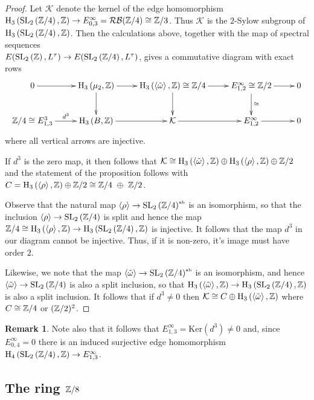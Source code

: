 \documentclass[12pt]{amsart}
\theoremstyle{definition}
\newtheorem{rem}[lem]{Remark}
\newcommand{\Z}{\Bbb{Z}}
\newcommand{\LL}{L^{\tau}}
\newcommand{\spl}[2]{\operatorname{SL}_{#1}\left(#2\right)}
\newcommand{\rbl}[1]{{\mathcal{RB}}(#1)}%
\newcommand{\<}{\langle}
\renewcommand{\>}{\rangle}
\renewcommand{\ker}[1]{\mathrm{Ker}(#1)}
\newcommand{\an}[1]{\left\langle{#1}\right\rangle}
\newcommand{\gab}[1]{{#1}^{\mbox{\tiny{ab}}}}%
\newcommand{\ho}[3]{\mathrm{H}_{#1}\left( #2,#3 \right)}
\begin{document}
\begin{proof}
Let $\mathcal{K}$ denote the kernel of the edge homomorphism $\ho{3}{\spl{2}{\Z/4}}{\Z}\to E^\infty_{0,3}=\rbl{\Z/4}\cong\Z/3$. Thus $\mathcal{K}$ is the 
$2$-Sylow subgroup of $\ho{3}{\spl{2}{\Z/4}}{\Z}$.  Then the calculations above, together with the map of spectral sequences\\
 $E(\spl{2}{\Z},\LL)\to E(\spl{2}{\Z/4},\LL)$,  gives a commutative diagram with exact rows
\[
\xymatrix{0\ar[r]&\ho{3}{\mu_2}{\Z}\ar[r]\ar[d]&\ho{3}{\an{\tilde{\omega}}}{\Z}\cong\Z/4\ar[r]\ar[d]&E^\infty_{1,2}\cong\Z/2\ar[r]\ar^-{\cong}[d]&0\\
\Z/4\cong E^3_{1,3}\ar^-{d^3}[r]&\ho{3}{B}{\Z}\ar[r]&\mathcal{K}\ar[r]&E^\infty_{1,2}\ar[r]&0
}
\]
where all vertical arrows are injective.  

If $d^3$ is the zero map, it then follows that $\mathcal{K}\cong \ho{3}{\an{\tilde{\omega}}}{\Z}\oplus \ho{3}{\an{\rho}}{\Z}\oplus \Z/2$ and the statement of the proposition follows 
with $C= \ho{3}{\an{\rho}}{\Z}\oplus \Z/2\cong \Z/4\ \oplus \ \Z/2$.

Observe that the natural map $\an{\rho}\to\gab{\spl{2}{\Z/4}}$ is an isomorphism, so that the inclusion $\an{\rho}\to\spl{2}{\Z/4}$ is split and hence the map
$\Z/4\cong\ho{3}{\an{\rho}}{\Z}\to\ho{3}{\spl{2}{\Z/4}}{\Z}$ is injective. It follows that the map $d^3$ in our diagram cannot be injective. Thus, if it is non-zero, it's image must have order $2$. 

Likewise, we note that the map $\an{\tilde{\omega}}\to \gab{\spl{2}{\Z/4}}$ is an isomorphism, and hence $\an{\tilde{\omega}}\to\spl{2}{\Z/4}$ is also a split inclusion, so that 
$\ho{3}{\an{\tilde{\omega}}}{\Z}\to\ho{3}{\spl{2}{\Z/4}}{\Z}$ is also a split inclusion. It follows that if $d^3\not=0$ then $\mathcal{K}\cong C\oplus\ho{3}{\an{\tilde{\omega}}}{\Z}$
where $C\cong \Z/4$ or $(\Z/2)^2$.
\end{proof}




\begin{rem}
 Note also that it follows that $E^\infty_{1,3}=\ker{d^3}\not=0$ and, since $E^\infty_{0,4}=0$ there is an induced surjective edge homomorphism $\ho{4}{\spl{2}{\Z/4}}{\Z}\to E^\infty_{1,3}$.
\end{rem}

\subsection{The ring $\Z/8$}\label{sec:z8}
\end{document}
